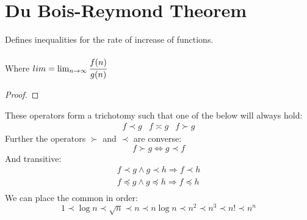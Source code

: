 \documentclass{report}
\begin{document}
\section*{Du Bois-Reymond Theorem}
Defines inequalities for the rate of increase of functions.
\\
\\ Where $lim = \lim_{n \to \infty}{\cfrac{f(n)}{g(n)}}$
\begin{proof}
\end{proof}
These operators form a trichotomy such that one of the below will always hold:
\[\begin{matrix}
		f \prec g & f \asymp g & f \succ g
	\end{matrix}\]
Further the operators $\succ$ and $\prec$ are converse:
\[f \succ g \Leftrightarrow g \prec f\]
And transitive:
\[\begin{matrix}
		f \prec g \land g \prec h \Rightarrow f \prec h                      \\
		f \preccurlyeq g \land g \preccurlyeq h \Rightarrow f \preccurlyeq h \\
	\end{matrix}\]
We can place the common  in order:
\[1 \prec \log{n} \prec \sqrt{n} \prec n \prec n \log{n} \prec n^2 \prec n^3 \prec n! \prec n^n\]
\end{document}
